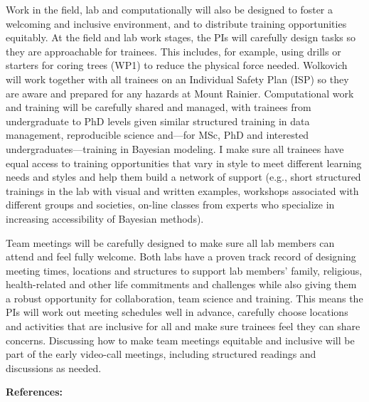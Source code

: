 \documentclass[12pt,oneside]{article}
\begin{document}
Work in the field, lab and computationally will also be designed to foster a welcoming and inclusive environment, and to distribute training opportunities equitably. At the field and lab work stages, the PIs will carefully design tasks so they are approachable for trainees. This includes, for example, using drills or starters for coring trees (WP1) to reduce the physical force needed.  Wolkovich will work together with all trainees on an Individual Safety Plan (ISP) so they are aware and prepared for any hazards at Mount Rainier.  Computational work and training will be carefully shared and managed, with trainees from undergraduate to PhD levels given similar structured training in data management, reproducible science and---for MSc, PhD and interested undergraduates---training in Bayesian modeling. I make sure all trainees have equal access to training opportunities that vary in style to meet different learning needs and styles and help them build a network of support (e.g., short structured trainings in the lab with visual and written examples, workshops associated with different groups and societies, on-line classes from experts who specialize in increasing accessibility of Bayesian methods). %

Team meetings will be carefully designed to make sure all lab members can attend and feel fully welcome. Both labs have a proven track record of designing meeting times, locations and structures to support lab members' family, religious, health-related and other life commitments and challenges while also giving them a robust opportunity for collaboration, team science and training. This means the PIs will work out meeting schedules well in advance, carefully choose locations and activities that are inclusive for all and make sure trainees feel they can share concerns. Discussing how to make team meetings equitable and inclusive  will be part of the early video-call meetings, including structured readings and discussions as needed. %


\clearpage
\setcounter{page}{1}
{\bf References:}
{\def\section*#1{}
}
\end{document}
